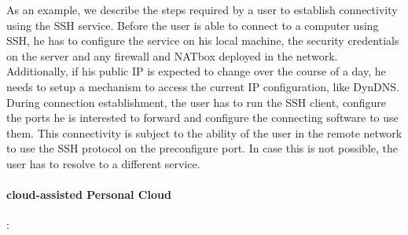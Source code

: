 As an example, we describe the steps required by a user to establish
connectivity using the SSH service. Before the user is able to connect to a
computer using SSH, he has to configure the service on his local machine, the
security credentials on the server and any firewall and NATbox deployed in the
network. Additionally, if his public IP is expected to change over the course of
a day, he needs to setup a mechanism to access the current IP configuration,
like DynDNS.  During connection establishment, the user has to run the SSH
client, configure the ports he is interested to forward and configure the
connecting software to use them.  This connectivity is subject to the ability of
the user in the remote network to use the SSH protocol on the preconfigure port.
In case this is not possible, the user has to resolve to a different service.

\paragraph*{cloud-assisted Personal Cloud}:


